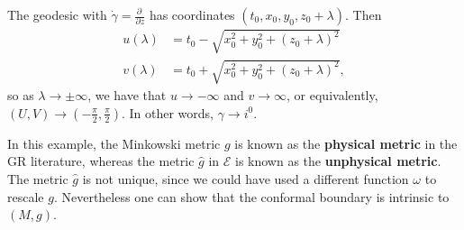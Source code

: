 \documentclass[10pt,a4paper]{exam}
\newcommand{\sttl}[1]{{\color{darkblue}\sffamily\bfseries #1}}
\newcommand{\pder}[2]{\frac{\partial #1}{\partial #2}}
\newcommand{\esu}{\mathscr{E}}
\begin{document}
\begin{questions}
\begin{solution}
          The geodesic with $\dot\gamma = \pder{~}{z}$ has coordinates
          $(t_0, x_0, y_0, z_0 + \lambda)$.  Then
          \begin{equation*}
            \begin{split}
              u(\lambda) &= t_0 - \sqrt{x_0^2 + y_0^2 + (z_0 + \lambda)^2}\\
              v(\lambda) &= t_0 + \sqrt{x_0^2 + y_0^2 + (z_0 + \lambda)^2},
            \end{split}
          \end{equation*}
          so as $\lambda \to \pm \infty$, we have that
          $u \to -\infty$ and $v \to \infty$, or equivalently, $(U,V)
          \to (-\frac\pi2,\frac\pi2)$.  In other words, $\gamma \to
          i^0$.
        \end{solution}

      \begin{EnvUplevel}
        In this example, the Minkowski metric $g$ is known as the
        \sttl{physical metric} in the GR literature, whereas the
        metric $\hat g$ in $\esu$ is known as the \sttl{unphysical
          metric}.  The metric $\hat g$ is not unique, since we could
        have used a different function $\omega$ to rescale $g$.
        Nevertheless one can show that the conformal boundary is
        intrinsic to $(M,g)$.
      \end{EnvUplevel}
\end{questions}
\end{document}
